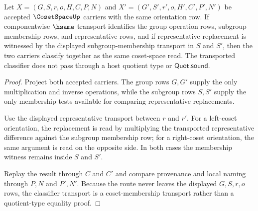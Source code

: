 \begin{theorem}
\label{thm:coset-space-classifier-transport}
Let $X=(G,S,r,o,H,C,P,N)$ and $X'=(G',S',r',o,H',C',P',N')$ be accepted $\CosetSpaceUp$ carriers with the same orientation row. If componentwise $\hsame$ transport identifies the group operation rows, subgroup membership rows, and representative rows, and if representative replacement is witnessed by the displayed subgroup-membership transport in $S$ and $S'$, then the two carriers classify together as the same coset-space read. The transported classifier does not pass through a host quotient type or $\mathsf{Quot.sound}$.
\end{theorem}
\begin{proof}
Project both accepted carriers. The group rows $G,G'$ supply the only multiplication and inverse operations, while the subgroup rows $S,S'$ supply the only membership tests available for comparing representative replacements.

Use the displayed representative transport between $r$ and $r'$. For a left-coset orientation, the replacement is read by multiplying the transported representative difference against the subgroup membership row; for a right-coset orientation, the same argument is read on the opposite side. In both cases the membership witness remains inside $S$ and $S'$.

Replay the result through $C$ and $C'$ and compare provenance and local naming through $P,N$ and $P',N'$. Because the route never leaves the displayed $G,S,r,o$ rows, the classifier transport is a coset-membership transport rather than a quotient-type equality proof.
\end{proof}




